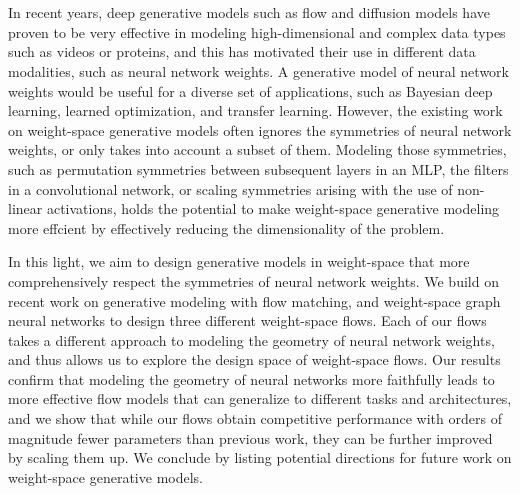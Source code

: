 \chapter{\abstractname}

In recent years, deep generative models such as flow and diffusion models have proven to be very effective in modeling high-dimensional and complex data types such as videos or proteins, and this has motivated their use in different data modalities, such as neural network weights. A generative model of neural network weights would be useful for a diverse set of applications, such as Bayesian deep learning, learned optimization, and transfer learning. However, the existing work on weight-space generative models often ignores the symmetries of neural network weights, or only takes into account a subset of them. Modeling those symmetries, such as permutation symmetries between subsequent layers in an MLP, the filters in a convolutional network, or scaling symmetries arising with the use of non-linear activations, holds the potential to make weight-space generative modeling more effcient by effectively reducing the dimensionality of the problem. 

In this light, we aim to design generative models in weight-space that more comprehensively respect the symmetries of neural network weights. We build on recent work on generative modeling with flow matching, and weight-space graph neural networks to design three different weight-space flows. Each of our flows takes a different approach to modeling the geometry of neural network weights, and thus allows us to explore the design space of weight-space flows. Our results confirm that modeling the geometry of neural networks more faithfully leads to more effective flow models that can generalize to different tasks and architectures, and we show that while our flows obtain competitive performance with orders of magnitude fewer parameters than previous work, they can be further improved by scaling them up. We conclude by listing potential directions for future work on weight-space generative models.